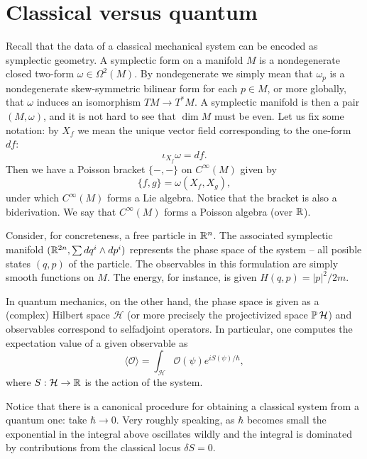 \documentclass{amsart}
\begin{document}
\section{Classical versus quantum}
Recall that the data of a classical mechanical system can be encoded as symplectic geometry.
A symplectic form on a manifold $M$ is a nondegenerate closed two-form $\omega\in\Omega^2(M)$. 
By nondegenerate we simply mean that $\omega_p$ is a nondegenerate skew-symmetric bilinear form
for each $p\in M$, or more globally, that $\omega$ induces an isomorphism $TM\to T^*M$.
A symplectic manifold is then a pair $(M,\omega)$, and it is not hard to see that $\dim M$ must be even.
Let us fix some notation: by $X_f$ we mean the unique vector field corresponding to the one-form $df$:
\begin{equation*}
    \iota_{X_f}\omega = df.
\end{equation*}
Then we have a Poisson bracket $\{-,-\}$ on $C^\infty(M)$ given by
\begin{equation*}
    \{f, g\} = \omega(X_f, X_g),
\end{equation*}
under which $C^\infty(M)$ forms a Lie algebra. Notice that the bracket is also a biderivation. We say that
$C^\infty(M)$ forms a Poisson algebra (over $\mathbb{R}$).

Consider, for concreteness, a free particle in $\mathbb{R}^n$. The associated symplectic manifold
$(\mathbb{R}^{2n}, \sum dq^i\wedge dp^i)$ represents the phase space of the system -- all posible states $(q,p)$
of the particle. The observables in this formulation are simply smooth functions on $M$. The energy, for
instance, is given $H(q,p)=|p|^2/2m$.

In quantum mechanics, on the other hand, the phase space is given as a (complex) Hilbert space $\mathcal{H}$
(or more precisely the projectivized space $\operatorname{\mathbb{P}} \mathcal{H}$) and observables correspond to selfadjoint
operators. In particular, one computes the expectation value of a given observable as
\begin{equation*}
    \langle\mathcal{O}\rangle = \int_\mathcal{H} \mathcal{O}(\psi) e^{iS(\psi)/\hbar},
\end{equation*}
where $S:\mathcal{H}\to\mathbb{R}$ is the action of the system.

Notice that there is a canonical procedure for obtaining a classical system from a quantum one:
take $\hbar\to0$. Very roughly speaking, as $\hbar$ becomes small the exponential in the integral
above oscillates wildly and the integral is dominated by contributions from the classical locus $\delta S=0$.
\end{document}
